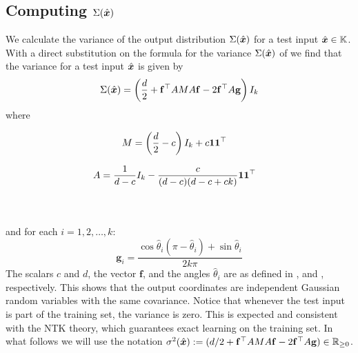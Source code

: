 \subsection{Computing $\Sigma(\hat{\boldsymbol{x}})$}
\label{sub:variance}
We calculate the variance of the output distribution $\Sigma(\hat{\boldsymbol{x}})$ for a test input $\hat{\boldsymbol{x}} \in \mathbb{K}$. With a direct substitution on the formula for the variance $\Sigma(\hat{\boldsymbol{x}})$ of   we find that the variance for a test input $\hat{\boldsymbol{x}}$ is given by 
\begin{equation}
    \Sigma(\hat{\boldsymbol{x}}) = \left(\frac{d}{2}+\mathbf{f}^\top AMA \mathbf{f} - 2\mathbf{f}^\top A \mathbf{g}\right)I_k
\end{equation}
where \\
\begin{minipage}{0.49\textwidth}
\begin{align}
    M &= \left(\frac{d}{2}-c\right)I_k + c \boldsymbol{1}\boldsymbol{1}^\top \label{eq:M_matrix} 
\end{align}
\end{minipage}
\hfill
\begin{minipage}{0.49\textwidth}
\begin{align}
    A &= \frac{1}{d-c} I_k - \frac{c}{(d-c)(d-c+ck)}\boldsymbol{1}\boldsymbol{1}^\top \label{eq:A_matrix}
\end{align}
\end{minipage}
\\ \\
and for each $i=1,2,\dots,k$:
\begin{equation}
\mathbf{g}_i = \frac{\cos \hat{\theta}_i(\pi - \hat{\theta}_i) + \sin \hat{\theta}_i}{2k\pi}
\label{eq:vect_g}
\end{equation}
The scalars $c$ and $d$, the vector $\mathbf{f}$, and the angles $\hat{\theta}_i$ are as defined in ,  and , respectively. This shows that the output coordinates are independent Gaussian random variables with the same covariance. Notice that whenever the test input is part of the training set, the variance is zero. This is expected and consistent with the NTK theory, which guarantees exact learning on the training set. In what follows we will use the notation $\sigma^2(\hat{\boldsymbol{x}}) := (d/2+\mathbf{f}^\top AMA \mathbf{f} - 2\mathbf{f}^\top A \mathbf{g}) \in \mathbb{R}_{\geq 0}$.

